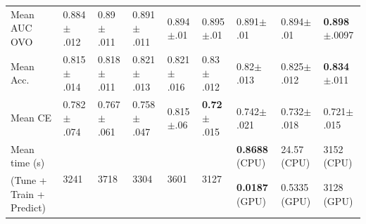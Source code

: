 \begin{tabular}{@{\hskip 0mm}
l@{\hskip 1mm}
l@{\hskip 1mm}
l@{\hskip 1mm}
l@{\hskip 1mm}
l@{\hskip 1mm}
l@{\hskip 1mm}
l@{\hskip 1mm}
l@{\hskip 1mm}
l@{\hskip 0mm}}
\midrule
Mean AUC OVO
                                         &  0.884$\pm$.012 &   0.89$\pm$.011 &  0.891$\pm$.011 &   0.894$\pm$.01 &           0.895$\pm$.01 &    0.891$\pm$.01 &   0.894$\pm$.01 &  \textbf{0.898}$\pm$.0097 \\
Mean Acc.            &  0.815$\pm$.014 &  0.818$\pm$.011 &  0.821$\pm$.013 &  0.821$\pm$.016 &           0.83$\pm$.012 &    0.82$\pm$.013 &  0.825$\pm$.012 &   \textbf{0.834}$\pm$.011 \\
Mean CE              &  0.782$\pm$.074 &  0.767$\pm$.061 &  0.758$\pm$.047 &   0.815$\pm$.06 &  \textbf{0.72}$\pm$.015 &   0.742$\pm$.021 &  0.732$\pm$.018 &            0.721$\pm$.015 \\
\midrule
Mean time (s) 
                                    &            \multirow{2}{*}{3241} &            \multirow{2}{*}{3718} &            \multirow{2}{*}{3304} &            \multirow{2}{*}{3601} &                    \multirow{2}{*}{3127} &  \textbf{0.8688} (CPU) &          24.57 (CPU) &                      3152 (CPU) \\
(Tune + Train + Predict)                                                                        &             &             &             &             &                     &  \textbf{0.0187} (GPU) &          0.5335 (GPU) &                      3128 (GPU) \\
\bottomrule
\end{tabular}
